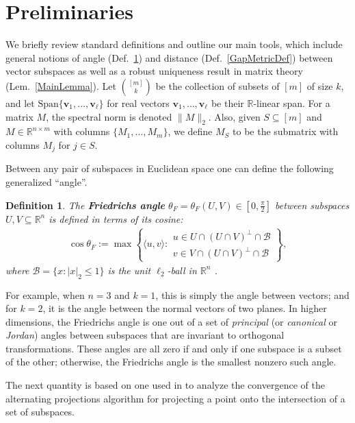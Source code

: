 \documentclass[journal, twocolumn]{IEEEtran}
\newtheorem{definition}{Definition}
\begin{document}
\section{Preliminaries}\label{Preliminaries}
We briefly review standard definitions and outline our main tools, which include general notions of angle (Def.~\ref{FriedrichsDefinition}) and distance (Def.~\ref{GapMetricDef}) between vector subspaces as well as a robust uniqueness result in  matrix theory (Lem.~\ref{MainLemma}).
Let ${[m] \choose k}$ be the collection of subsets of $[m]$ of size $k$, and let $\text{Span}\{\mathbf{v}_1, \ldots, \mathbf{v}_\ell\}$ for real vectors $\mathbf{v}_1, \ldots, \mathbf{v}_\ell$ be their $\mathbb{R}$-linear span.  For a matrix $M$, the spectral norm is denoted $\|M\|_2$.
Also, given $S \subseteq [m]$ and $M \in \mathbb{R}^{n \times m}$ with columns $\{M_1,\ldots,M_m\}$, we define $M_S$ to be the submatrix with columns $M_j$ for $j \in S$.  %

Between any pair of subspaces in Euclidean space one can define the following generalized ``angle''.
\begin{definition}\label{FriedrichsDefinition}
The \textbf{Friedrichs angle} $\theta_F = \theta_F(U,V) \in [0,\frac{\pi}{2}]$ between subspaces $U,V \subseteq \mathbb{R}^n$ is defined in terms of its cosine:
\begin{align}
\cos{\theta_F} := \max\left\{ \langle u, v \rangle: \substack{ u \in U \cap (U \cap V)^\perp \cap \mathcal{B} \\ v \in V \cap (U \cap V)^\perp \cap \mathcal{B} } \right\},
\end{align}
where $\mathcal{B} = \{ x: |x|_2 \leq 1\}$ is the unit $\ell_2$-ball in $\mathbb{R}^n$ \cite{Deutsch12}.
\end{definition}
For example, when $n=3$ and $k=1$, this is simply the angle between vectors; and for $k=2$, it is the angle between the normal vectors of two planes. In higher dimensions, the Friedrichs angle is one out of a set of \textit{principal} (or \textit{canonical} or \textit{Jordan}) angles between subspaces that are invariant to orthogonal transformations. These angles are all zero if and only if one subspace is a subset of the other; otherwise, the Friedrichs angle is the smallest nonzero such angle. 

The next quantity is based on one used in \cite{Deutsch12} to analyze the convergence of the alternating projections algorithm for projecting a point onto the intersection of a set of subspaces.
\end{document}
